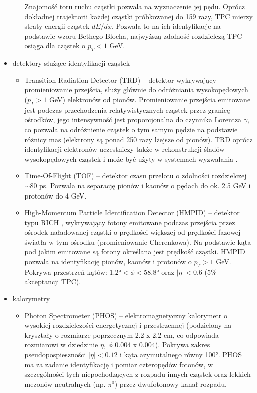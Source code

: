 \begin{itemize}
\begin{itemize}
		Znajomość toru ruchu cząstki pozwala na wyznaczenie jej pędu. Oprócz dokładnej trajektorii każdej cząstki próbkowanej do 159 razy, TPC mierzy straty energii cząstek $dE/dx$. Pozwala to na ich identyfikacje na podstawie wzoru Bethego-Blocha, najwyższą zdolność rozdzielczą TPC osiąga dla cząstek o $p_T < 1$ GeV.
	\end{itemize}
	\item detektory służące identyfikacji cząstek 
	\begin{itemize}
		\item Transition Radiation Detector (TRD) -- detektor wykrywający promieniowanie przejścia, służy głównie do odróżniania wysokopędowych ($p_T > 1$ GeV) elektronów od pionów. Promieniowanie przejścia emitowane jest podczas przechodzenia relatywistycznych cząstek przez granicę ośrodków, jego intensywność jest proporcjonalna do czynnika Lorentza $\gamma$, co pozwala na odróżnienie cząstek o tym samym pędzie na podstawie różnicy mas (elektrony są ponad 250 razy lżejsze od pionów). TRD oprócz identyfikacji elektronów uczestniczy także w rekonstrukcji śladów wysokopędowych cząstek i może być użyty w systemach wyzwalania .
		\item Time-Of-Flight (TOF) -- detektor czasu przelotu o zdolności rozdzielczej $\sim80$ ps. Pozwala na separację pionów i kaonów o pędach do ok. 2.5 GeV i protonów do 4 GeV.  
		\item High-Momentum Particle Identification Detector (HMPID) -- detektor typu RICH , wykrywający fotony emitowane podczas przejścia przez ośrodek naładowanej cząstki o prędkości większej od prędkości fazowej światła w tym ośrodku (promieniowanie Cherenkowa). Na podstawie kąta pod jakim emitowane są fotony określana jest prędkość cząstki. HMPID pozwala na identyfikację pionów, kaonów i protonów o $p_T > 1$ GeV. Pokrywa przestrzeń kątów: $\ang{1.2} < \phi < \ang{58.8}$ oraz $|\eta| < 0.6$ (5\% akceptancji TPC).
	\end{itemize}
	\item kalorymetry
	\begin{itemize}
		\item Photon Spectrometer (PHOS) -- elektromagnetyczny kalorymetr o wysokiej rozdzielczości energetycznej i przestrzennej (podzielony na kryształy o rozmiarze poprzecznym 2.2 x 2.2 cm, co odpowiada rozmiarowi w dziedzinie $\eta,~\phi$ 0.004 x 0.004). Pokrywa zakres pseudopospieszności $|\eta| < 0.12$ i kąta azymutalnego równy \ang{100}. PHOS ma za zadanie identyfikację i pomiar czteropędów fotonów, w szczególności tych niepochodzących z rozpadu innych cząstek  oraz lekkich mezonów neutralnych (np. $\pi^0$) przez dwufotonowy kanał rozpadu.

\end{itemize}
\end{itemize}

